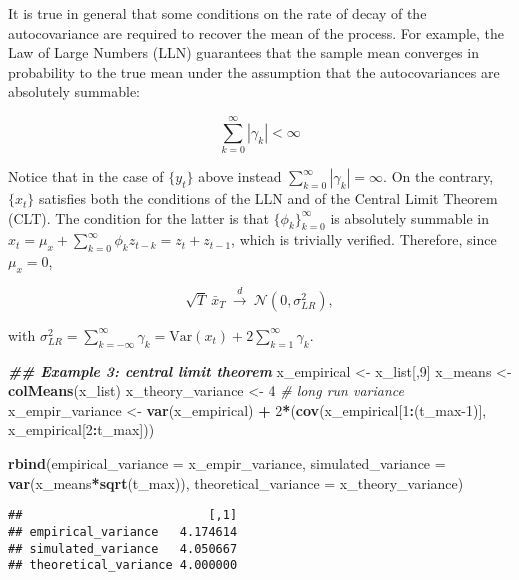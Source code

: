 \documentclass[
]{book}
\newenvironment{Shaded}{\begin{snugshade}}{\end{snugshade}}
\newcommand{\AttributeTok}[1]{\textcolor[rgb]{0.13,0.29,0.53}{#1}}
\newcommand{\CommentTok}[1]{\textcolor[rgb]{0.56,0.35,0.01}{\textit{#1}}}
\newcommand{\DecValTok}[1]{\textcolor[rgb]{0.00,0.00,0.81}{#1}}
\newcommand{\DocumentationTok}[1]{\textcolor[rgb]{0.56,0.35,0.01}{\textbf{\textit{#1}}}}
\newcommand{\FunctionTok}[1]{\textcolor[rgb]{0.13,0.29,0.53}{\textbf{#1}}}
\newcommand{\NormalTok}[1]{#1}
\newcommand{\OtherTok}[1]{\textcolor[rgb]{0.56,0.35,0.01}{#1}}
\newcommand{\SpecialCharTok}[1]{\textcolor[rgb]{0.81,0.36,0.00}{\textbf{#1}}}
\begin{document}
It is true in general that some conditions on the rate of decay of the autocovariance are required to recover the mean of the process. For example, the Law of Large Numbers (LLN) guarantees that the sample mean converges in probability to the true mean under the assumption that the autocovariances are absolutely summable:

\[
\sum_{k=0}^\infty |\gamma_k| < \infty
\]

Notice that in the case of \(\{y_t\}\) above instead \(\sum_{k=0}^\infty |\gamma_k| = \infty\). On the contrary, \(\{x_t\}\) satisfies both the conditions of the LLN and of the Central Limit Theorem (CLT). The condition for the latter is that \(\{\phi_k\}_{k=0}^\infty\) is absolutely summable in \(x_t = \mu_x + \sum_{k=0}^\infty\phi_k z_{t-k} = z_t + z_{t-1}\), which is trivially verified. Therefore, since \(\mu_x = 0\),

\[
\sqrt{T} \ \bar{x}_T  \ \xrightarrow{d} \ \mathcal{N}(0, \sigma^2_{LR}),
\]

with \(\sigma^2_{LR} = \sum_{k=-\infty}^\infty \gamma_k = \text{Var}(x_t) + 2\sum_{k=1}^\infty \gamma_k\).

\begin{Shaded}
\begin{Highlighting}[]
\DocumentationTok{\#\# Example 3: central limit theorem}
\NormalTok{x\_empirical }\OtherTok{\textless{}{-}}\NormalTok{ x\_list[,}\DecValTok{9}\NormalTok{]}
\NormalTok{x\_means }\OtherTok{\textless{}{-}} \FunctionTok{colMeans}\NormalTok{(x\_list)}
\NormalTok{x\_theory\_variance }\OtherTok{\textless{}{-}} \DecValTok{4}  \CommentTok{\# long run variance}
\NormalTok{x\_empir\_variance }\OtherTok{\textless{}{-}} \FunctionTok{var}\NormalTok{(x\_empirical) }\SpecialCharTok{+} \DecValTok{2}\SpecialCharTok{*}\NormalTok{(}\FunctionTok{cov}\NormalTok{(x\_empirical[}\DecValTok{1}\SpecialCharTok{:}\NormalTok{(t\_max}\DecValTok{{-}1}\NormalTok{)], x\_empirical[}\DecValTok{2}\SpecialCharTok{:}\NormalTok{t\_max]))}

\FunctionTok{rbind}\NormalTok{(}\AttributeTok{empirical\_variance =}\NormalTok{ x\_empir\_variance,}
      \AttributeTok{simulated\_variance =} \FunctionTok{var}\NormalTok{(x\_means}\SpecialCharTok{*}\FunctionTok{sqrt}\NormalTok{(t\_max)),}
      \AttributeTok{theoretical\_variance =}\NormalTok{ x\_theory\_variance)}
\end{Highlighting}
\end{Shaded}

\begin{verbatim}
##                          [,1]
## empirical_variance   4.174614
## simulated_variance   4.050667
## theoretical_variance 4.000000
\end{verbatim}
\end{document}
